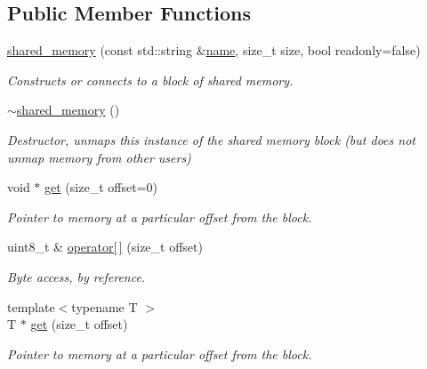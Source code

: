 \subsection*{Public Member Functions}
\begin{DoxyCompactItemize}
\item 
\hyperlink{classcpen333_1_1process_1_1windows_1_1shared__memory_a3a2044ba961f9fc394e166273a3efa20}{shared\+\_\+memory} (const std\+::string \&\hyperlink{classcpen333_1_1process_1_1impl_1_1named__resource__base_a53986a0a1dd26a3602b842c45613b79d}{name}, size\+\_\+t size, bool readonly=false)
\begin{DoxyCompactList}\small\item\em Constructs or connects to a block of shared memory. \end{DoxyCompactList}\item 
\hyperlink{classcpen333_1_1process_1_1windows_1_1shared__memory_a6355690147ae22f25d4bceed8ad63011}{$\sim$shared\+\_\+memory} ()
\begin{DoxyCompactList}\small\item\em Destructor, unmaps this instance of the shared memory block (but does not unmap memory from other users) \end{DoxyCompactList}\item 
void $\ast$ \hyperlink{classcpen333_1_1process_1_1windows_1_1shared__memory_a3bbd718728dc2fa2fbe4058b8a207594}{get} (size\+\_\+t offset=0)
\begin{DoxyCompactList}\small\item\em Pointer to memory at a particular offset from the block. \end{DoxyCompactList}\item 
uint8\+\_\+t \& \hyperlink{classcpen333_1_1process_1_1windows_1_1shared__memory_a931719bdcc1558973d6fcb7a79f52f22}{operator\mbox{[}$\,$\mbox{]}} (size\+\_\+t offset)
\begin{DoxyCompactList}\small\item\em Byte access, by reference. \end{DoxyCompactList}\item 
{\footnotesize template$<$typename T $>$ }\\T $\ast$ \hyperlink{classcpen333_1_1process_1_1windows_1_1shared__memory_a2f2fa53c705df531b6126ed2da84c347}{get} (size\+\_\+t offset)
\begin{DoxyCompactList}\small\item\em Pointer to memory at a particular offset from the block. \end{DoxyCompactList}\item 

\end{DoxyCompactItemize}
